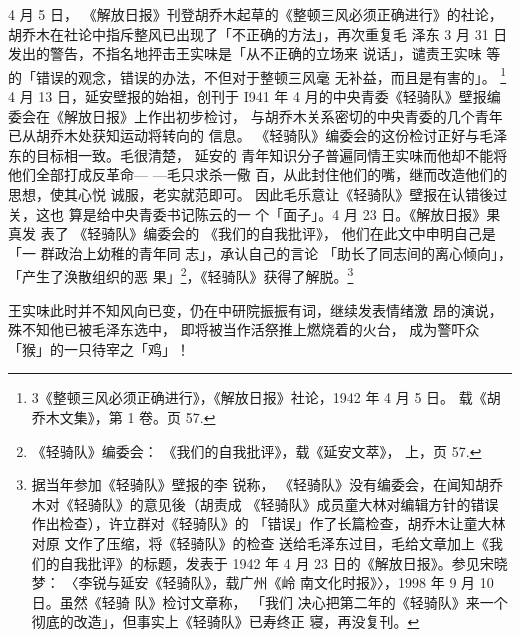 4 月 5 日， 《解放日报》刊登胡乔木起草的《整顿三风必须正确进行》的社论，
胡乔木在社论中指斥整风已出现了「不正确的方法」，再次重复毛 泽东 3 月 31
日发出的警告，不指名地抨击王实味是「从不正确的立场来 说话」，谴责王实味
等的「错误的观念，错误的办法，不但对于整顿三风毫 无补益，而且是有害的」。
\footnote{3《整顿三风必须正确进行》，《解放日报》社论，1942 年 4 月 5 日。
载《胡乔木文集》，第 1 卷。页 57.  } 4 月 13 日，延安壁报的始祖，创刊于
I941 年 4 月的中央青委《轻骑队》壁报编委会在《解放日报》上作出初步检讨，
与胡乔木关系密切的中央青委的几个青年已从胡乔木处获知运动将转向的 信息。
《轻骑队》编委会的这份检讨正好与毛泽东的目标相一致。毛很清楚， 延安的
青年知识分子普遍同情王实味而他却不能将他们全部打成反革命— —毛只求杀一儆
百，从此封住他们的嘴，继而改造他们的思想，使其心悦 诚服，老实就范即可。
因此毛乐意让《轻骑队》壁报在认错後过关，这也 算是给中央青委书记陈云的一
个「面子」。4 月 23 日。《解放日报》果真发 表了 《轻骑队》编委会的
《我们的自我批评》， 他们在此文中申明自己是 「一 群政治上幼稚的青年同
志」，承认自己的言论 「助长了同志间的离心倾向」， 「产生了涣散组织的恶
果」\footnote{《轻骑队》编委会： 《我们的自我批评》，载《延安文萃》，
上，页 57.}，《轻骑队》获得了解脱。\footnote{据当年参加《轻骑队》壁报的李
锐称， 《轻骑队》没有编委会，在闻知胡乔木对《轻骑队》的意见後（胡责成
《轻骑队》成员童大林对编辑方针的错误作出检查），许立群对《轻骑队》的
「错误」作了长篇检查，胡乔木让童大林对原 文作了压缩，将《轻骑队》的检查
送给毛泽东过目，毛给文章加上《我们的自我批评》的标题，发表于 1942 年 4
月 23 日的《解放日报》。参见宋晓梦： 〈李锐与延安《轻骑队》，载广州《岭
南文化时报》〉，1998 年 9 月 10 日。虽然《轻骑 队》检讨文章称， 「我们
决心把第二年的《轻骑队》来一个彻底的改造」，但事实上《轻骑队》已寿终正
寝，再没复刊。}

王实味此时并不知风向已变，仍在中研院振振有词，继续发表情绪激
昂的演说，
殊不知他已被毛泽东选中，
即将被当作活祭推上燃烧着的火台，
成为警吓众「猴」的一只待宰之「鸡」！

